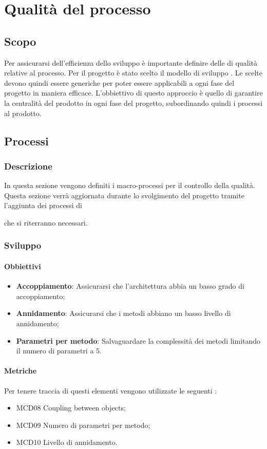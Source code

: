 \section{Qualità del processo}
\label{QProcesso}
\subsection{Scopo}
Per assicurarsi dell'efficienza dello sviluppo è importante definire delle  di qualità relative al processo.
Per il progetto è stato scelto il modello di sviluppo .
Le  scelte devono quindi essere generiche per poter essere applicabili a ogni fase del progetto in maniera efficace.
L'obbiettivo di questo approccio è quello di garantire la centralità del prodotto in ogni fase del progetto, subordinando quindi i processi al prodotto.

\subsection{Processi}
\subsubsection{Descrizione}
In questa sezione vengono definiti i macro-processi per il controllo della qualità.
Questa sezione verrà aggiornata durante lo svolgimento del progetto tramite l'aggiunta dei processi di  che si riterranno necessari.

\subsubsection{Sviluppo}
\paragraph{Obbiettivi}
\begin{itemize}
\item \textbf{Accoppiamento}: Assicurarsi che l'architettura abbia un basso grado di accoppiamento;
\item \textbf{Annidamento}: Assicurarsi che i metodi abbiano un basso livello di annidamento;
\item \textbf{Parametri per metodo}: Salvaguardare la complessità dei metodi limitando il numero di parametri a 5.
\end{itemize}

\paragraph{Metriche}
Per tenere traccia di questi elementi vengono utilizzate le seguenti :
\begin{itemize}
\item MCD08 Coupling between objects;
\item MCD09 Numero di parametri per metodo;
\item MCD10 Livello di annidamento.

\end{itemize}


